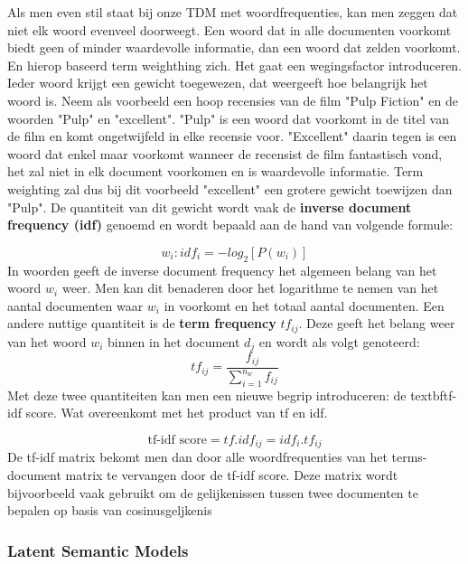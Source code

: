 Als men even stil staat bij onze TDM met woordfrequenties, kan men zeggen dat niet elk woord evenveel doorweegt. Een woord dat in alle documenten voorkomt biedt geen of minder waardevolle informatie, dan een woord dat zelden voorkomt. En hierop baseerd term weighthing zich. Het gaat een wegingsfactor introduceren. Ieder woord krijgt een gewicht toegewezen, dat weergeeft hoe belangrijk het woord is. Neem als voorbeeld een hoop recensies van de film "Pulp Fiction" en de woorden "Pulp" en "excellent". "Pulp" is een woord dat voorkomt in de titel van de film en komt ongetwijfeld in elke recensie voor. "Excellent" daarin tegen is een woord dat enkel maar voorkomt wanneer de recensist de film fantastisch vond, het zal niet in elk document voorkomen en is waardevolle informatie. Term weighting zal dus bij dit voorbeeld "excellent" een grotere gewicht toewijzen dan "Pulp". 
%
De quantiteit van dit gewicht wordt vaak de \textbf{inverse document frequency  (idf)} genoemd en wordt bepaald aan de hand van volgende formule:

\[w_{i}: idf_{i} = -log_{2}[P(w_{i})] \]  
%
In woorden geeft de inverse document frequency het algemeen belang van het woord $w_{i}$ weer. Men kan dit benaderen door het logarithme te nemen van het aantal documenten waar $w_{i}$ in voorkomt en het totaal aantal documenten.
Een andere nuttige quantiteit is de  \textbf{term frequency} $tf_{ij}$. Deze geeft het belang weer van het woord $w_{i}$ binnen in het document $d_{j}$  en wordt als volgt genoteerd:
\[ tf_{ij} = \frac{f_{ij}}{ \sum_{i=1}^{n_{w}}f_{ij}} \]
%
Met deze twee quantiteiten kan men een nieuwe begrip introduceren: de textbf{tf-idf score}. Wat overeenkomt met het product van tf en idf.
 
\[ \text{tf-idf score} = tf . idf_{ij} = idf_{i} . tf_{ij} \]
%
De tf-idf matrix bekomt men dan door alle woordfrequenties van het terms-document matrix te vervangen door de tf-idf score.
Deze matrix wordt bijvoorbeeld vaak gebruikt om de gelijkenissen tussen twee documenten te bepalen op basis van cosinusgeljkenis


\subsubsection{Latent Semantic Models}\label{Latent Semantic Models}

